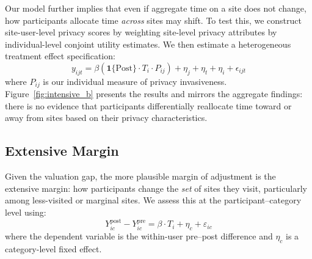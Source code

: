 \documentclass[12pt]{article}
\theoremstyle{definition}
\theoremstyle{remark}
\begin{document}
Our model further implies that even if aggregate time on a site does not change, how participants allocate time \emph{across} sites may shift. To test this, we construct site-user-level privacy scores by weighting site-level privacy attributes by individual-level conjoint utility estimates. We then estimate a heterogeneous treatment effect specification:
\begin{equation}
    y_{ijt} = \beta(\mathbf{1}\{\text{Post}\} \cdot T_i \cdot P_{ij}) + \eta_j + \eta_t + \eta_i + \epsilon_{ijt}
\end{equation}
where $P_{ij}$ is our individual measure of privacy invasiveness. Figure~\ref{fig:intensive_b} presents the results and mirrors the aggregate findings: there is no evidence that participants differentially reallocate time toward or away from sites based on their privacy characteristics.

\subsection{Extensive Margin}
 
Given the valuation gap, the more plausible margin of adjustment is the extensive margin: how participants change the \emph{set} of sites they visit, particularly among less-visited or marginal sites. We assess this at the participant--category level using:
\begin{equation}
    Y^{\text{post}}_{ic} - Y^{\text{pre}}_{ic} = \beta \cdot T_i + \eta_c + \varepsilon_{ic}
\end{equation}
where the dependent variable is the within-user pre--post difference and $\eta_c$ is a category-level fixed effect.
\end{document}
